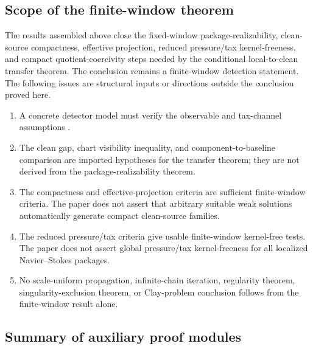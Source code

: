\documentclass[11pt]{article}
\numberwithin{equation}{section}
\theoremstyle{definition}
\theoremstyle{remark}
\begin{document}
\subsection{Scope of the finite-window theorem}
\label{sec:scope-finite-window}

The results assembled above close the fixed-window package-realizability,
clean-source compactness, effective projection, reduced pressure/tax
kernel-freeness, and compact quotient-coercivity steps needed by the conditional
local-to-clean transfer theorem.  The conclusion remains a finite-window
detection statement.  The following issues are structural inputs or directions
outside the conclusion proved here.
\begin{enumerate}[label=(\roman*),leftmargin=*]
    \item A concrete detector model must verify the observable and tax-channel
    assumptions .
    \item The clean gap, chart visibility inequality, and
    component-to-baseline comparison are imported hypotheses for the transfer
    theorem; they are not derived from the package-realizability theorem.
    \item The compactness and effective-projection criteria are sufficient
    finite-window criteria.  The paper does not assert that arbitrary suitable
    weak solutions automatically generate compact clean-source families.
    \item The reduced pressure/tax criteria give usable finite-window
    kernel-free tests.  The paper does not assert global pressure/tax
    kernel-freeness for all localized Navier--Stokes packages.
    \item No scale-uniform propagation, infinite-chain iteration, regularity
    theorem, singularity-exclusion theorem, or Clay-problem conclusion follows
    from the finite-window result alone.
\end{enumerate}

\subsection{Summary of auxiliary proof modules}
\label{sec:proof-inventory}
\end{document}
